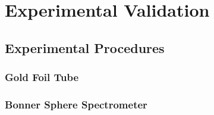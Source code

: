 
\cleardoublepage


\chapter{Experimental Validation}


\section{Experimental Procedures}


\subsection{Gold Foil Tube}


\subsection{Bonner Sphere Spectrometer}





